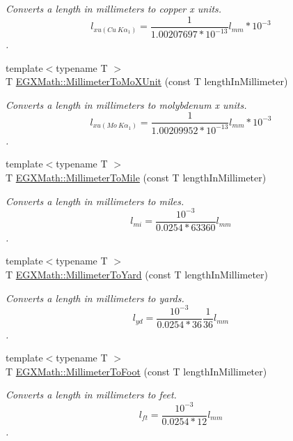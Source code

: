 \begin{DoxyCompactItemize}
\begin{DoxyCompactList}\small\item\em Converts a length in millimeters to copper x units. \[ l_{xu(Cu\ K\alpha_1)}= \frac{1}{1.00207697*10^{-13}} l_{mm} * 10^{-3}\]. \end{DoxyCompactList}\item 
{\footnotesize template$<$typename T $>$ }\\T \mbox{\hyperlink{group___e_g_x_math-_conversions-_length_conversions-_s_i-_millimeter-_non-_s_i_ga1f0be98bc702f46a69579b27e05a2439}{E\+G\+X\+Math\+::\+Millimeter\+To\+Mo\+X\+Unit}} (const T length\+In\+Millimeter)
\begin{DoxyCompactList}\small\item\em Converts a length in millimeters to molybdenum x units. \[ l_{xu(Mo\ K\alpha_1)}=\frac{1}{1.00209952*10^{-13}} l_{mm} * 10^{-3}\]. \end{DoxyCompactList}\item 
{\footnotesize template$<$typename T $>$ }\\T \mbox{\hyperlink{group___e_g_x_math-_conversions-_length_conversions-_s_i-_millimeter-_imperial_ga8a11dcd8f7866189b30e01d65e003e2d}{E\+G\+X\+Math\+::\+Millimeter\+To\+Mile}} (const T length\+In\+Millimeter)
\begin{DoxyCompactList}\small\item\em Converts a length in millimeters to miles. \[ l_{mi}=\frac{10^{-3}}{0.0254 * 63360} l_{mm} \]. \end{DoxyCompactList}\item 
{\footnotesize template$<$typename T $>$ }\\T \mbox{\hyperlink{group___e_g_x_math-_conversions-_length_conversions-_s_i-_millimeter-_imperial_gae1b144c2bc56f6591e0ee9b37f0653fa}{E\+G\+X\+Math\+::\+Millimeter\+To\+Yard}} (const T length\+In\+Millimeter)
\begin{DoxyCompactList}\small\item\em Converts a length in millimeters to yards. \[ l_{yd}= \frac{10^{-3}}{0.0254 * 36} \frac{1}{36} l_{mm} \]. \end{DoxyCompactList}\item 
{\footnotesize template$<$typename T $>$ }\\T \mbox{\hyperlink{group___e_g_x_math-_conversions-_length_conversions-_s_i-_millimeter-_imperial_ga96513545d32f8e86044a3a3551840023}{E\+G\+X\+Math\+::\+Millimeter\+To\+Foot}} (const T length\+In\+Millimeter)
\begin{DoxyCompactList}\small\item\em Converts a length in millimeters to feet. \[ l_{ft}= \frac{10^{-3}}{0.0254 * 12} l_{mm} \]. \end{DoxyCompactList}\item 

\end{DoxyCompactItemize}

